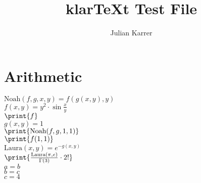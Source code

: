 \documentclass[oneside, a4paper]{article}
\author{Julian Karrer}
\title{klarTeXt Test File}
\begin{document}
\maketitle
\section*{Arithmetic}

\begin{program}

$\text{Noah}(f,g,x,y) = f(g(x, y), y)$\\
$f(x,y) = y^2\cdot \sin{\frac{x}{y}}$\\
$\print{f}$\\
$g(x,y) = 1$\\
$\print{\text{Noah}(f,g,1,1)}$\\
$\print{f(1,1)}$\\
$\text{Laura}(x,y) = e^{-g(x,y)}$\\
$\print{\frac{\text{Laura}(\pi, e)}{\Gamma(3)}\cdot 2!}$\\
$a = b$\\
$b = c$\\
$c = 4$\\


\end{program}
\end{document}
